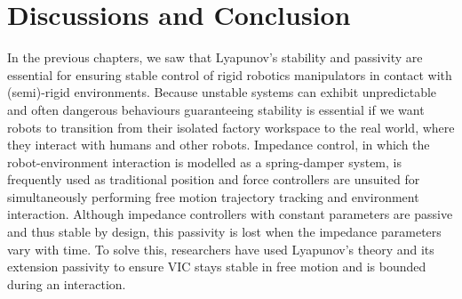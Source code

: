 \chapter{Discussions and Conclusion}
\label{chapter:conclusion}

In the previous chapters, we saw that Lyapunov's stability and passivity are essential for ensuring stable control of rigid robotics manipulators in contact with (semi)-rigid environments. Because unstable systems can exhibit unpredictable and often dangerous behaviours guaranteeing stability is essential if we want robots to transition from their isolated factory workspace to the real world, where they interact with humans and other robots. Impedance control, in which the robot-environment interaction is modelled as a spring-damper system, is frequently used as traditional position and force controllers are unsuited for simultaneously performing free motion trajectory tracking and environment interaction. Although impedance controllers with constant parameters are passive and thus stable by design, this passivity is lost when the impedance parameters vary with time. To solve this, researchers have used Lyapunov's theory and its extension passivity to ensure VIC stays stable in free motion and is bounded during an interaction.


